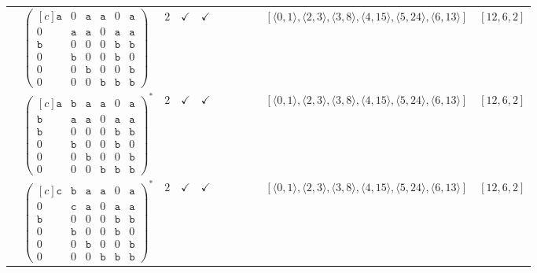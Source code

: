 \documentclass[12pt]{article}
\theoremstyle{definition}
\theoremstyle{plain}
\begin{document}
{\begin{longtable}{@{}cYcccccccZc@{}}
& $\begin{pmatrix*}[c]
\mathtt{a}  &  0  &  \mathtt{a}  &  \mathtt{a}  &  0  &  \mathtt{a}  \\
0  &  \mathtt{a}  &  \mathtt{a}  &  0  &  \mathtt{a}  &  \mathtt{a}  \\
\mathtt{b}  &  0  &  0  &  0  &  \mathtt{b}  &  \mathtt{b}  \\
0  &  \mathtt{b}  &  0  &  0  &  \mathtt{b}  &  0  \\
0  &  0  &  \mathtt{b}  &  0  &  0  &  \mathtt{b}  \\
0  &  0  &  0  &  \mathtt{b}  &  \mathtt{b}  &  \mathtt{b}
\end{pmatrix*}$
& $2$
& $\checkmark$
& $\checkmark$
&
&
&
&
& $[\langle0,1\rangle,\allowbreak\langle2,3\rangle,\allowbreak\langle3,8\rangle,\allowbreak\langle4,15\rangle,\allowbreak\langle5,24\rangle,\allowbreak\langle6,13\rangle]$
& $[12,6,2]$    \\

\cmidrule(lr){2-11}

& $\begin{pmatrix*}[c]
\mathtt{a}  &  \mathtt{b}  &  \mathtt{a}  &  \mathtt{a}  &  0  &  \mathtt{a}  \\
\mathtt{b}  &  \mathtt{a}  &  \mathtt{a}  &  0  &  \mathtt{a}  &  \mathtt{a}  \\
\mathtt{b}  &  0  &  0  &  0  &  \mathtt{b}  &  \mathtt{b}  \\
0  &  \mathtt{b}  &  0  &  0  &  \mathtt{b}  &  0  \\
0  &  0  &  \mathtt{b}  &  0  &  0  &  \mathtt{b}  \\
0  &  0  &  0  &  \mathtt{b}  &  \mathtt{b}  &  \mathtt{b}
\end{pmatrix*}^*$
& $2$
& $\checkmark$
& $\checkmark$
&
&
&
&
& $[\langle0,1\rangle,\allowbreak\langle2,3\rangle,\allowbreak\langle3,8\rangle,\allowbreak\langle4,15\rangle,\allowbreak\langle5,24\rangle,\allowbreak\langle6,13\rangle]$
& $[12,6,2]$ \\

\cmidrule(lr){2-11}

& $\begin{pmatrix*}[c]
\mathtt{c}  &  \mathtt{b}  &  \mathtt{a}  &  \mathtt{a}  &  0  &  \mathtt{a}  \\
0  &  \mathtt{c}  &  \mathtt{a}  &  0  &  \mathtt{a}  &  \mathtt{a}  \\
\mathtt{b}  &  0  &  0  &  0  &  \mathtt{b}  &  \mathtt{b}  \\
0  &  \mathtt{b}  &  0  &  0  &  \mathtt{b}  &  0  \\
0  &  0  &  \mathtt{b}  &  0  &  0  &  \mathtt{b}  \\
0  &  0  &  0  &  \mathtt{b}  &  \mathtt{b}  &  \mathtt{b}
\end{pmatrix*}^*$
& $2$
& $\checkmark$
& $\checkmark$
&
&
&
&
& $[\langle0,1\rangle,\allowbreak\langle2,3\rangle,\allowbreak\langle3,8\rangle,\allowbreak\langle4,15\rangle,\allowbreak\langle5,24\rangle,\allowbreak\langle6,13\rangle]$
& $[12,6,2]$ \\


\end{longtable}}
\end{document}
